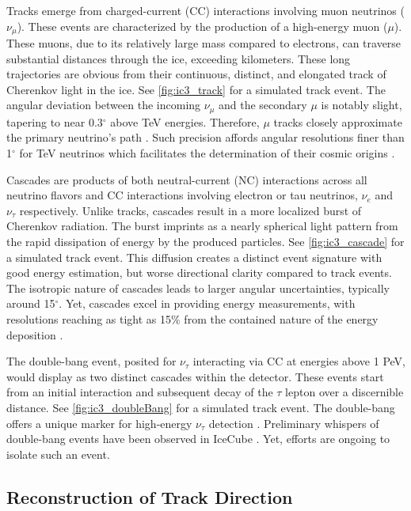 Tracks emerge from charged-current (CC) interactions involving muon neutrinos ($\nu_\mu$).
These events are characterized by the production of a high-energy muon ($\mu$).
These muons, due to its relatively large mass compared to electrons, can traverse substantial distances through the ice, exceeding kilometers.
These long trajectories are obvious from their continuous, distinct, and elongated track of Cherenkov light in the ice.
See \cref{fig:ic3_track} for a simulated track event.
The angular deviation between the incoming $\nu_\mu$ and the secondary $\mu$ is notably slight, tapering to near 0.3$^\circ$ above TeV energies.
Therefore, $\mu$ tracks closely approximate the primary neutrino's path \cite{physics_withIC3,IC3_energyReco}.
Such precision affords angular resolutions finer than 1$^\circ$ for TeV neutrinos which facilitates the determination of their cosmic origins \cite{physics_withIC3}.

Cascades are products of both neutral-current (NC) interactions across all neutrino flavors and CC interactions involving electron or tau neutrinos, $\nu_e$ and $\nu_\tau$ respectively.
Unlike tracks, cascades result in a more localized burst of Cherenkov radiation.
The burst imprints as a nearly spherical light pattern from the rapid dissipation of energy by the produced particles.
See \cref{fig:ic3_cascade} for a simulated track event.
This diffusion creates a distinct event signature with good energy estimation, but worse directional clarity compared to track events.
The isotropic nature of cascades leads to larger angular uncertainties, typically around 15$^\circ$.
Yet, cascades excel in providing energy measurements, with resolutions reaching as tight as 15\% from the contained nature of the energy deposition \cite{physics_withIC3,IC3_energyReco}.

The double-bang event, posited for $\nu_\tau$ interacting via CC at energies above 1 PeV, would display as two distinct cascades within the detector.
These events start from an initial interaction and subsequent decay of the $\tau$ lepton over a discernible distance.
See \cref{fig:ic3_doubleBang} for a simulated track event.
The double-bang offers a unique marker for high-energy $\nu_\tau$ detection \cite{physics_withIC3}.
Preliminary whispers of double-bang events have been observed in IceCube \cite{IC3_taus}.
Yet, efforts are ongoing to isolate such an event.

\subsection{Reconstruction of Track Direction}

